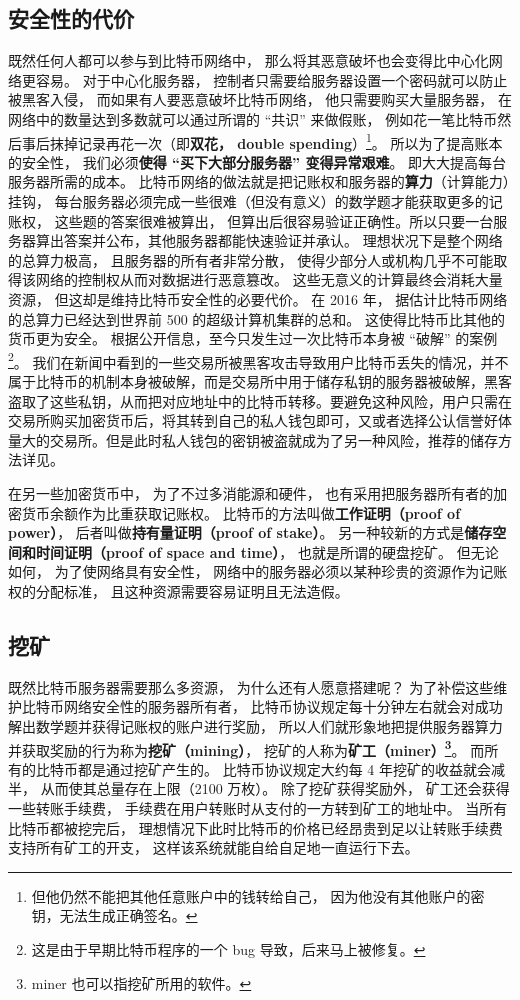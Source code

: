 \subsection{安全性的代价}
既然任何人都可以参与到比特币网络中， 那么将其恶意破坏也会变得比中心化网络更容易。 对于中心化服务器， 控制者只需要给服务器设置一个密码就可以防止被黑客入侵， 而如果有人要恶意破坏比特币网络， 他只需要购买大量服务器， 在网络中的数量达到多数就可以通过所谓的 “共识” 来做假账， 例如花一笔比特币然后事后抹掉记录再花一次（即\textbf{双花， double spending}）\footnote{但他仍然不能把其他任意账户中的钱转给自己， 因为他没有其他账户的密钥，无法生成正确签名。}。 所以为了提高账本的安全性， 我们必须\textbf{使得 “买下大部分服务器” 变得异常艰难}。 即大大提高每台服务器所需的成本。 比特币网络的做法就是把记账权和服务器的\textbf{算力}（计算能力）挂钩， 每台服务器必须完成一些很难（但没有意义）的数学题才能获取更多的记账权， 这些题的答案很难被算出， 但算出后很容易验证正确性。所以只要一台服务器算出答案并公布，其他服务器都能快速验证并承认。 理想状况下是整个网络的总算力极高， 且服务器的所有者非常分散， 使得少部分人或机构几乎不可能取得该网络的控制权从而对数据进行恶意篡改。 这些无意义的计算最终会消耗大量资源， 但这却是维持比特币安全性的必要代价。 在 2016 年， 据估计比特币网络的总算力已经达到世界前 500 的超级计算机集群的总和。 这使得比特币比其他的货币更为安全。 根据公开信息，至今只发生过一次比特币本身被 “破解” 的案例\footnote{这是由于早期比特币程序的一个 bug 导致，后来马上被修复。}。 我们在新闻中看到的一些交易所被黑客攻击导致用户比特币丢失的情况，并不属于比特币的机制本身被破解，而是交易所中用于储存私钥的服务器被破解，黑客盗取了这些私钥，从而把对应地址中的比特币转移。要避免这种风险，用户只需在交易所购买加密货币后，将其转到自己的私人钱包即可，又或者选择公认信誉好体量大的交易所。但是此时私人钱包的密钥被盗就成为了另一种风险，推荐的储存方法详见。

在另一些加密货币中， 为了不过多消能源和硬件， 也有采用把服务器所有者的加密货币余额作为比重获取记账权。 比特币的方法叫做\textbf{工作证明（proof of power）}， 后者叫做\textbf{持有量证明（proof of stake）}。 另一种较新的方式是\textbf{储存空间和时间证明（proof of space and time）}， 也就是所谓的硬盘挖矿。 但无论如何， 为了使网络具有安全性， 网络中的服务器必须以某种珍贵的资源作为记账权的分配标准， 且这种资源需要容易证明且无法造假。

\subsection{挖矿}
既然比特币服务器需要那么多资源， 为什么还有人愿意搭建呢？ 为了补偿这些维护比特币网络安全性的服务器所有者， 比特币协议规定每十分钟左右就会对成功解出数学题并获得记账权的账户进行奖励， 所以人们就形象地把提供服务器算力并获取奖励的行为称为\textbf{挖矿（mining）}， 挖矿的人称为\textbf{矿工（miner）\footnote{miner 也可以指挖矿所用的软件。}}。 而所有的比特币都是通过挖矿产生的。 比特币协议规定大约每 4 年挖矿的收益就会减半， 从而使其总量存在上限（2100 万枚）。 除了挖矿获得奖励外， 矿工还会获得一些转账手续费， 手续费在用户转账时从支付的一方转到矿工的地址中。 当所有比特币都被挖完后， 理想情况下此时比特币的价格已经昂贵到足以让转账手续费支持所有矿工的开支， 这样该系统就能自给自足地一直运行下去。

